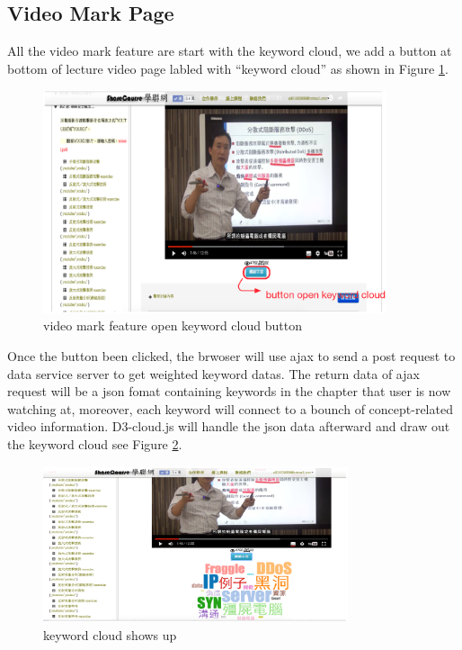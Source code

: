 \subsection{Video Mark Page}
All the video mark feature are start with the keyword cloud, we add a button at bottom of lecture video page labled with ``keyword cloud'' as shown in Figure \ref{fig:cloudbutton}.

\begin{figure}[H]
    \centering
    \includegraphics[width = 0.9\textwidth]{fig/cloudbutton.eps}
    \caption{video mark feature open keyword cloud button}
    \label{fig:cloudbutton}
\end{figure}

Once the button been clicked, the brwoser will use ajax to send a post request to data service server to get weighted keyword datas.
The return data of ajax request will be a json fomat containing keywords in the chapter that user is now watching at, moreover, each keyword will connect to a bounch of concept-related video information.
D3-cloud.js will handle the json data afterward and draw out the keyword cloud see Figure \ref{fig:cloudopened}.

\begin{figure}[H]
    \centering
    \includegraphics[width = 0.8\textwidth]{fig/cloudopened.eps}
    \caption{keyword cloud shows up}
    \label{fig:cloudopened}
\end{figure}

